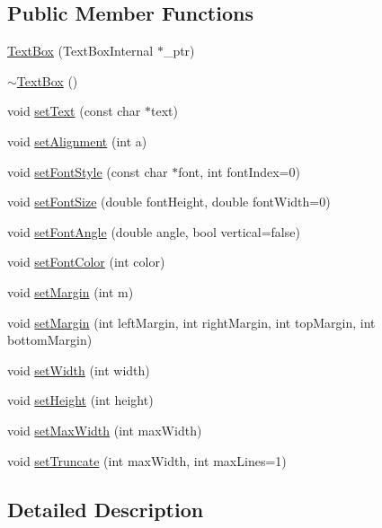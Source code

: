 \subsection*{Public Member Functions}
\begin{DoxyCompactItemize}
\item 
\hyperlink{class_text_box_a46da0ed5f14f4d49cfb5ebbe449f395b}{Text\+Box} (Text\+Box\+Internal $\ast$\+\_\+ptr)
\item 
\hyperlink{class_text_box_ac3cc88a3ac171658ebaf44b01f4adf80}{$\sim$\+Text\+Box} ()
\item 
void \hyperlink{class_text_box_a29307e42860b1de681bbf02e58c1ee8e}{set\+Text} (const char $\ast$text)
\item 
void \hyperlink{class_text_box_ab5afee7f63b0c165717bfc28d050262f}{set\+Alignment} (int a)
\item 
void \hyperlink{class_text_box_a5df18fab11787fa81049cd11dbfe4e8e}{set\+Font\+Style} (const char $\ast$font, int font\+Index=0)
\item 
void \hyperlink{class_text_box_ac0f1e542059007afdbc987f9799afa59}{set\+Font\+Size} (double font\+Height, double font\+Width=0)
\item 
void \hyperlink{class_text_box_a30feafdb422cdad2c53a3dc63a1f8d91}{set\+Font\+Angle} (double angle, bool vertical=false)
\item 
void \hyperlink{class_text_box_a991aea7906f9a570f47804b35206fe3a}{set\+Font\+Color} (int color)
\item 
void \hyperlink{class_text_box_aaadf6bbde148a221869df43c11a0d623}{set\+Margin} (int m)
\item 
void \hyperlink{class_text_box_a4e56a85bbd89b369c13d9f9e571f1950}{set\+Margin} (int left\+Margin, int right\+Margin, int top\+Margin, int bottom\+Margin)
\item 
void \hyperlink{class_text_box_a05bc472408f11199e79490193553f6ad}{set\+Width} (int width)
\item 
void \hyperlink{class_text_box_afd0657609449e31181b5fa738d51189c}{set\+Height} (int height)
\item 
void \hyperlink{class_text_box_a416f789fcda6ac8bf598739808a1fc43}{set\+Max\+Width} (int max\+Width)
\item 
void \hyperlink{class_text_box_a71d706a7ad9cda1093c03090e14563e9}{set\+Truncate} (int max\+Width, int max\+Lines=1)
\end{DoxyCompactItemize}


\subsection{Detailed Description}


